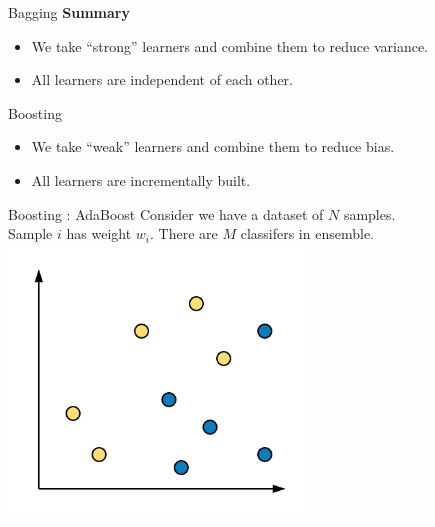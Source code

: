 \documentclass{beamer}
\begin{document}
	\begin{frame}{Bagging}
	\textbf{Summary}
	\begin{itemize}
		\item We take ``strong'' learners and combine them to reduce variance.
		\item All learners are independent of each other.
	\end{itemize}
	\end{frame}
	
	\begin{frame}{Boosting}
	\begin{itemize}
		\item We take ``weak'' learners and combine them to reduce bias.
		\item All learners are incrementally built.
	\end{itemize}
	\end{frame}
	
	\begin{frame}{Boosting : AdaBoost }
	Consider we have a dataset of $N$ samples.\\
	Sample $i$ has weight $w_i$. There are $M$ classifers in ensemble.\\
	\vspace{0.5cm}
	\centering
	\includegraphics[width = 0.6\textwidth]{ada_data}
	\end{frame}
\end{document}
